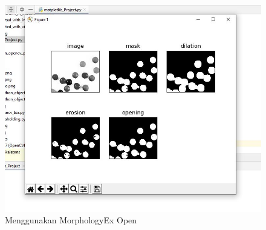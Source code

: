\begin{figure}[ht]
\centering
\includegraphics[scale=0.6]{figures/2,55.jpg}
\caption{Menggunakan MorphologyEx Open}
\label{contoh}
\end{figure}







\newpage
